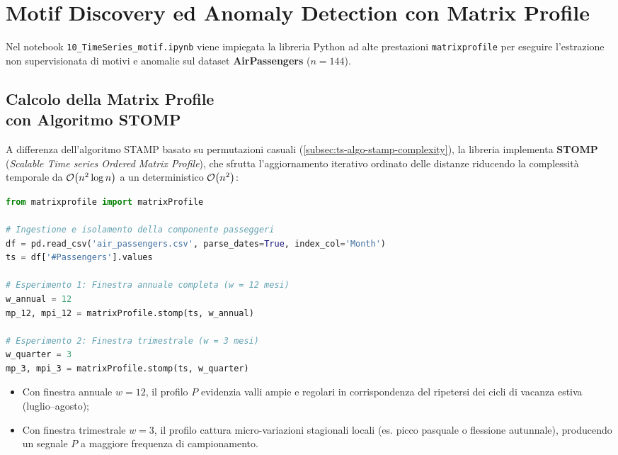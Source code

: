 \FloatBarrier
\section{Motif Discovery ed Anomaly Detection con Matrix Profile}
\label{sec:ts-lab-motif-matrixprofile}

Nel notebook \texttt{10\_TimeSeries\_motif.ipynb} viene impiegata la libreria Python ad alte prestazioni \texttt{matrixprofile} per eseguire l'estrazione non supervisionata di motivi e anomalie sul dataset \textbf{AirPassengers} ($n = 144$).

\FloatBarrier
\subsection[Calcolo della Matrix Profile con Algoritmo STOMP]{Calcolo della Matrix Profile\\con Algoritmo STOMP}
\label{subsec:ts-lab-stomp-computation}

A differenza dell'algoritmo STAMP basato su permutazioni casuali (\autoref{subsec:ts-algo-stamp-complexity}), la libreria implementa \textbf{STOMP} (\textit{Scalable Time series Ordered Matrix Profile}), che sfrutta l'aggiornamento iterativo ordinato delle distanze riducendo la complessit\`a temporale da $\mathcal{O}\!\left(n^2 \log n\right)$ a un deterministico $\mathcal{O}\!\left(n^2\right)$:

\begin{lstlisting}[language=Python, style=code]
from matrixprofile import matrixProfile

# Ingestione e isolamento della componente passeggeri
df = pd.read_csv('air_passengers.csv', parse_dates=True, index_col='Month')
ts = df['#Passengers'].values

# Esperimento 1: Finestra annuale completa (w = 12 mesi)
w_annual = 12
mp_12, mpi_12 = matrixProfile.stomp(ts, w_annual)

# Esperimento 2: Finestra trimestrale (w = 3 mesi)
w_quarter = 3
mp_3, mpi_3 = matrixProfile.stomp(ts, w_quarter)
\end{lstlisting}

\begin{remark}[Confronto Funzionale tra le Finestre $w=12$ e $w=3$]
\begin{itemize}
    \item Con finestra annuale $w = 12$, il profilo $P$ evidenzia valli ampie e regolari in corrispondenza del ripetersi dei cicli di vacanza estiva (luglio--agosto);
    \item Con finestra trimestrale $w = 3$, il profilo cattura micro-variazioni stagionali locali (es. picco pasquale o flessione autunnale), producendo un segnale $P$ a maggiore frequenza di campionamento.
\end{itemize}
\end{remark}

